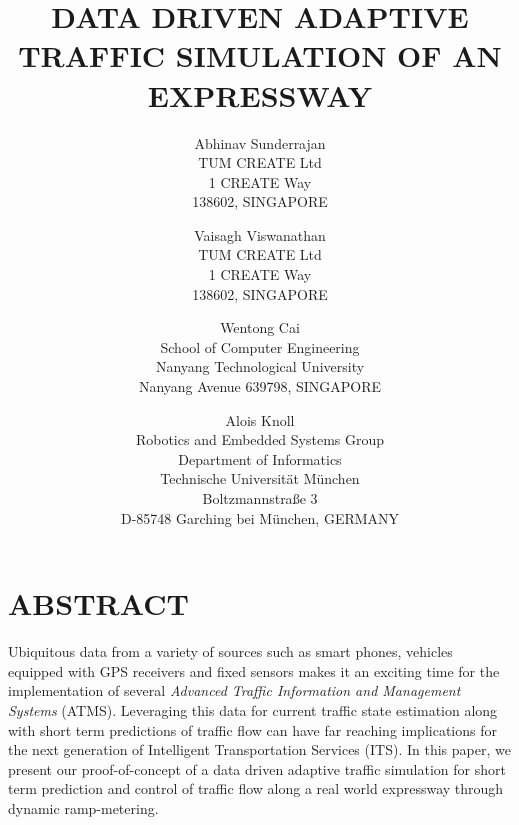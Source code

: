 \documentclass{wscpaperproc}
\theoremstyle{wsc}
\begin{document}
%
%

\title{DATA DRIVEN ADAPTIVE TRAFFIC SIMULATION OF AN EXPRESSWAY}

\author{Abhinav Sunderrajan\\ [12pt]
TUM CREATE Ltd \\
1 CREATE Way\\
138602, SINGAPORE\\
\and
Vaisagh Viswanathan\\[12pt]
TUM CREATE Ltd \\
1 CREATE Way\\
138602, SINGAPORE\\
\and
Wentong Cai\\ [12pt]
School of Computer Engineering\\
Nanyang Technological University\\
Nanyang Avenue 639798, SINGAPORE\\
\and
Alois Knoll\\ [12pt]
Robotics and Embedded Systems Group \\
Department of Informatics\\
Technische Universit\"at M\"unchen\\
Boltzmannstra{\ss}e 3\\
D-85748 Garching bei M\"unchen, GERMANY
}



\maketitle

\section*{ABSTRACT}
Ubiquitous data from a variety of sources such as smart phones, vehicles equipped with GPS receivers and fixed sensors makes it an exciting time for the implementation of several {\it Advanced Traffic Information and Management Systems} (ATMS). Leveraging this data for current traffic state estimation along with short term predictions of traffic flow can have far reaching implications for the next generation of Intelligent Transportation Services (ITS). In this paper, we present our proof-of-concept of a data driven adaptive traffic simulation for short term prediction and control of traffic flow along a real world expressway through dynamic ramp-metering.
\end{document}
